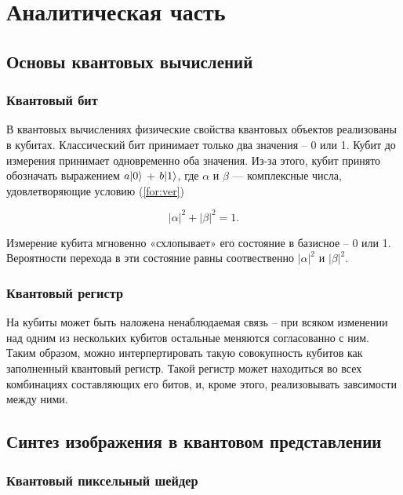 \chapter{Аналитическая часть}

\section{Основы квантовых вычислений}

\subsection{Квантовый бит}

В квантовых вычислениях физические свойства квантовых объектов реализованы в кубитах. Классический бит принимает только два значения – 0 или 1. Кубит до измерения принимает одновременно оба значения. Из-за этого, кубит принято обозначать выражением $a\lvert0\rangle$ + $b\lvert1\rangle$, где $\alpha$ и $\beta$ — комплексные числа, удовлетворяющие условию (\ref{for:ver})

\begin{equation}
\label{for:ver}
|\alpha|^2 + |\beta|^2 = 1. 
\end{equation} 

Измерение кубита мгновенно «схлопывает»  его состояние в базисное – 0 или 1. Вероятности перехода в эти состояние равны соотвественно $|\alpha|^2$ и $|\beta|^2$. 

\subsection{Квантовый регистр}

На кубиты может быть наложена ненаблюдаемая связь -- при всяком изменении над одним из нескольких кубитов остальные меняются согласованно с ним. Таким образом, можно интерпертировать такую совокупность кубитов как заполненный квантовый регистр. Такой регистр может находиться во всех комбинациях составляющих его битов, и, кроме этого, реализовывать завсимости между ними.

\section{Синтез изображения в квантовом представлении}

\subsection{Квантовый пиксельный шейдер}

